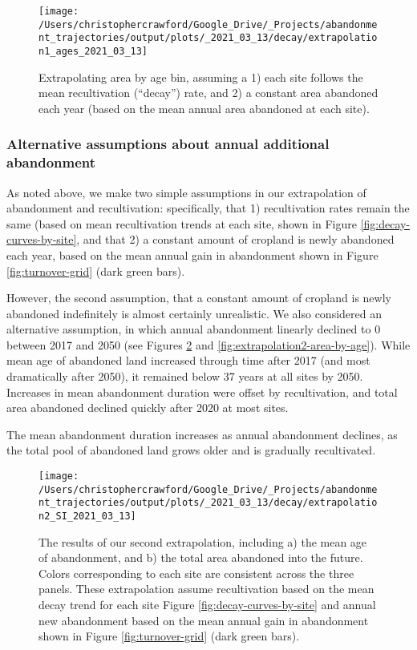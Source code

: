 \documentclass[9pt,twocolumn,twoside,]{pnas-new}
\begin{document}
\begin{figure}
\texttt{[image: /Users/christophercrawford/Google\_Drive/\_Projects/abandonment\_trajectories/output/plots/\_2021\_03\_13/decay/extrapolation1\_ages\_2021\_03\_13]} \caption{Extrapolating area by age bin, assuming a 1) each site follows the mean recultivation (``decay'') rate, and 2) a constant area abandoned each year (based on the mean annual area abandoned at each site).}\label{fig:extrapolation-area-by-age}
\end{figure}

\hypertarget{alternative-assumptions-about-annual-additional-abandonment}{%
\subsubsection{Alternative assumptions about annual additional abandonment}\label{alternative-assumptions-about-annual-additional-abandonment}}

As noted above, we make two simple assumptions in our extrapolation of abandonment and recultivation: specifically, that 1) recultivation rates remain the same (based on mean recultivation trends at each site, shown in Figure \ref{fig:decay-curves-by-site}, and that 2) a constant amount of cropland is newly abandoned each year, based on the mean annual gain in abandonment shown in Figure \ref{fig:turnover-grid} (dark green bars).

However, the second assumption, that a constant amount of cropland is newly abandoned indefinitely is almost certainly unrealistic.
We also considered an alternative assumption, in which annual abandonment linearly declined to 0 between 2017 and 2050 (see Figures \ref{fig:extrapolation2-combo} and \ref{fig:extrapolation2-area-by-age}).
While mean age of abandoned land increased through time after 2017 (and most dramatically after 2050), it remained below 37 years at all sites by 2050.
Increases in mean abandonment duration were offset by recultivation, and total area abandoned declined quickly after 2020 at most sites.

The mean abandonment duration increases as annual abandonment declines, as the total pool of abandoned land grows older and is gradually recultivated.



\begin{figure}
\texttt{[image: /Users/christophercrawford/Google\_Drive/\_Projects/abandonment\_trajectories/output/plots/\_2021\_03\_13/decay/extrapolation2\_SI\_2021\_03\_13]} \caption{The results of our second extrapolation, including a) the mean age of abandonment, and b) the total area abandoned into the future. Colors corresponding to each site are consistent across the three panels. These extrapolation assume recultivation based on the mean decay trend for each site Figure \ref{fig:decay-curves-by-site} and annual new abandonment based on the mean annual gain in abandonment shown in Figure \ref{fig:turnover-grid} (dark green bars).}\label{fig:extrapolation2-combo}
\end{figure}
\end{document}
